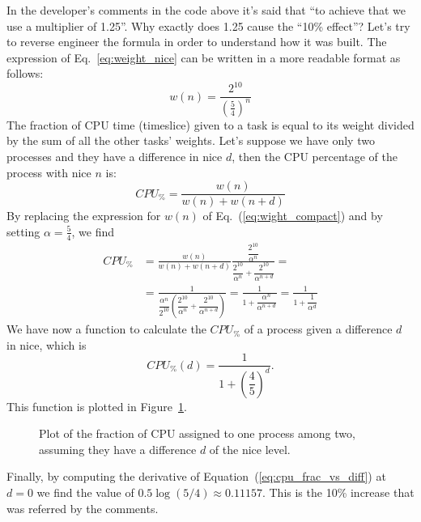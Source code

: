 In the developer's comments in the code above it's said that ``to achieve that we use a multiplier of 1.25''. Why exactly does 1.25 cause the ``10\% effect''? Let's try to reverse engineer the formula in order to understand how it was built. The expression of Eq.~\eqref{eq:weight_nice} can be written in a more readable format as follows:
\begin{equation}
    w(n) = \frac{2^{10}}{\left(\frac{5}{4}\right)^{n}}
    \label{eq:wight_compact}
\end{equation}
The fraction of CPU time (timeslice) given to a task is equal to its weight divided by the sum of all the other tasks' weights. Let's suppose we have only two processes and they have a difference in nice $d$, then the CPU percentage of the process with nice $n$ is:
\begin{equation}
    CPU_\% = \frac{w(n)}{w(n)+w(n+d)}
\end{equation}
By replacing the expression for $w(n)$ of Eq.~(\ref{eq:wight_compact}) and by setting $\alpha=\frac{5}{4}$, we find
\begin{align*}
    CPU_\% &=\frac{w(n)}{w(n)+w(n+d)} 
    \frac{\dfrac{2^{10}}{\alpha^{n}}}{\dfrac{2^{10}}{\alpha^{n}}+\dfrac{2^{10}}{\alpha^{n+d}}} =\\
    &=\frac{1}{\dfrac{\alpha^{n}}{2^{10}} \left(\dfrac{2^{10}}{\alpha^{n}}+\dfrac{2^{10}}{\alpha^{n+d}}\right)} =
    \frac{1}{1+\dfrac{\alpha^{n}}{\alpha^{n+d}}} =
    \frac{1}{1+\dfrac{1}{\alpha^{d}}}
\end{align*}
We have now a function to calculate the $CPU_\%$ of a process given a difference $d$ in nice, which is
\begin{equation}
    CPU_\%(d)=\frac{1}{1+\left(\dfrac{4}{5}\right)^{d}}.
    \label{eq:cpu_frac_vs_diff}
\end{equation}
This function is plotted in Figure~\ref{fig:plot_cpu}.
\begin{figure}[htb]
\centering
{}
\label{fig:plot_cpu}
\caption{Plot of the fraction of CPU assigned to one process among two, assuming they have a difference $d$ of the nice level.}
\end{figure}
Finally, by computing the derivative of Equation~(\ref{eq:cpu_frac_vs_diff}) at $d=0$ we find the value of $0.5\log(5/4)\approx 0.11157$. This is the 10\% increase that was referred by the comments. %

